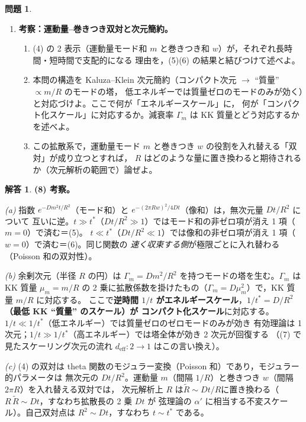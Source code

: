 \documentclass[dvipdfmx, uplatex]{jsarticle}
\theoremstyle{definition}
\newtheorem*{prob}{問題}
\newtheorem*{sol}{解答}
\begin{document}
\begin{prob}
\begin{enumerate}[start=8]
\item \textbf{考察：運動量--巻きつき双対と次元簡約。}
\begin{enumerate}
\item (4) の 2 表示（運動量モード和 $m$ と巻きつき和 $w$）が，それぞれ長時間・短時間で支配的になる
理由を，(5)(6) の結果と結びつけて述べよ。
\item 本問の構造を Kaluza--Klein 次元簡約（コンパクト次元 $\to$ ``質量'' $\propto m/R$ のモードの塔，
低エネルギーでは質量ゼロのモードのみが効く）と対応づけよ。ここで何が「エネルギースケール」に，
何が「コンパクト化スケール」に対応するか。減衰率 $\Gamma_m$ は KK 質量とどう対応するかを述べよ。
\item この拡散系で，運動量モード $m$ と巻きつき $w$ の役割を入れ替える「双対」が成り立つとすれば，
$R$ はどのような量に置き換わると期待されるか（次元解析の範囲で）論ぜよ。
\end{enumerate}
\end{enumerate}
\end{prob}

\begin{sol}
\textbf{(8) 考察。}

\textit{(a)} 指数 $e^{-Dm^2t/R^2}$（モード和）と $e^{-(2\pi Rw)^2/4Dt}$（像和）は，無次元量 $Dt/R^2$ について
互いに逆。$t\gg t^\ast$（$Dt/R^2\gg1$）ではモード和の非ゼロ項が消え 1 項（$m=0$）で済む＝(5)。
$t\ll t^\ast$（$Dt/R^2\ll1$）では像和の非ゼロ項が消え 1 項（$w=0$）で済む＝(6)。同じ関数の
\emph{速く収束する側}が極限ごとに入れ替わる（Poisson 和の双対性）。

\textit{(b)} 余剰次元（半径 $R$ の円）は $\Gamma_m=Dm^2/R^2$ を持つモードの塔を生む。$\Gamma_m$ は KK 質量
$\mu_m=m/R$ の 2 乗に拡散係数を掛けたもの（$\Gamma_m=D\mu_m^2$）で，KK 質量 $m/R$ に対応する。
ここで\textbf{逆時間 $1/t$ がエネルギースケール}，\textbf{$1/t^\ast=D/R^2$（最低 KK ``質量'' のスケール）が
コンパクト化スケール}に対応する。$1/t\ll1/t^\ast$（低エネルギー）では質量ゼロのゼロモードのみが効き
有効理論は 1 次元；$1/t\gg1/t^\ast$（高エネルギー）では塔全体が効き 2 次元が回復する
（(7) で見たスケーリング次元の流れ $d_{\mathrm{eff}}:2\to1$ はこの言い換え）。

\textit{(c)} (4) の双対は theta 関数のモジュラー変換（Poisson 和）であり，モジュラー的パラメータは
無次元の $Dt/R^2$。運動量 $m$（間隔 $1/R$）と巻きつき $w$（間隔 $2\pi R$）を入れ替える双対では，
次元解析上 $R$ は\textbf{$\tilde R\sim Dt/R$}に置き換わる（$R\,\tilde R\sim Dt$，すなわち拡散長の 2 乗 $Dt$ が
弦理論の $\alpha'$ に相当する不変スケール）。自己双対点は $R^2\sim Dt$，すなわち $t\sim t^\ast$ である。
\end{sol}
\end{document}
